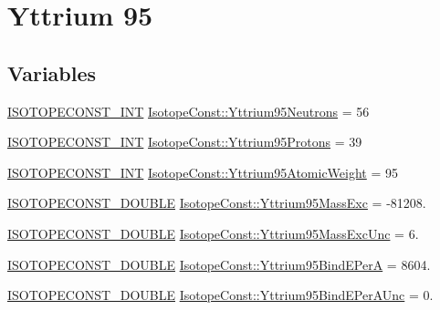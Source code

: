 \hypertarget{group___isotope_const-_yttrium-_y95}{}\section{Yttrium 95}
\label{group___isotope_const-_yttrium-_y95}
\subsection*{Variables}
\begin{DoxyCompactItemize}
\item 
\mbox{\hyperlink{group___isotope_const-_macros_ga5f18360b3e99483a35c32d789e62621c}{I\+S\+O\+T\+O\+P\+E\+C\+O\+N\+S\+T\+\_\+\+I\+NT}} \mbox{\hyperlink{group___isotope_const-_yttrium-_y95_ga8f85eb734a482be6c3b610a2967d51fb}{Isotope\+Const\+::\+Yttrium95\+Neutrons}} = 56
\item 
\mbox{\hyperlink{group___isotope_const-_macros_ga5f18360b3e99483a35c32d789e62621c}{I\+S\+O\+T\+O\+P\+E\+C\+O\+N\+S\+T\+\_\+\+I\+NT}} \mbox{\hyperlink{group___isotope_const-_yttrium-_y95_ga5155b7b4f49dbd48dd85a0bec4a0f83b}{Isotope\+Const\+::\+Yttrium95\+Protons}} = 39
\item 
\mbox{\hyperlink{group___isotope_const-_macros_ga5f18360b3e99483a35c32d789e62621c}{I\+S\+O\+T\+O\+P\+E\+C\+O\+N\+S\+T\+\_\+\+I\+NT}} \mbox{\hyperlink{group___isotope_const-_yttrium-_y95_ga82f6f86631e84db16be46bb376a884b4}{Isotope\+Const\+::\+Yttrium95\+Atomic\+Weight}} = 95
\item 
\mbox{\hyperlink{group___isotope_const-_macros_ga8f45a7272ce02c0b4c65c44636ed719a}{I\+S\+O\+T\+O\+P\+E\+C\+O\+N\+S\+T\+\_\+\+D\+O\+U\+B\+LE}} \mbox{\hyperlink{group___isotope_const-_yttrium-_y95_gaec2ba5a8d73164d57d788c4df63e86fa}{Isotope\+Const\+::\+Yttrium95\+Mass\+Exc}} = -\/81208.
\item 
\mbox{\hyperlink{group___isotope_const-_macros_ga8f45a7272ce02c0b4c65c44636ed719a}{I\+S\+O\+T\+O\+P\+E\+C\+O\+N\+S\+T\+\_\+\+D\+O\+U\+B\+LE}} \mbox{\hyperlink{group___isotope_const-_yttrium-_y95_ga426caf8c1ccc6c5d84141fd91df0d3e4}{Isotope\+Const\+::\+Yttrium95\+Mass\+Exc\+Unc}} = 6.
\item 
\mbox{\hyperlink{group___isotope_const-_macros_ga8f45a7272ce02c0b4c65c44636ed719a}{I\+S\+O\+T\+O\+P\+E\+C\+O\+N\+S\+T\+\_\+\+D\+O\+U\+B\+LE}} \mbox{\hyperlink{group___isotope_const-_yttrium-_y95_ga12a2c9711dc917d7257c215589fdbed7}{Isotope\+Const\+::\+Yttrium95\+Bind\+E\+PerA}} = 8604.
\item 
\mbox{\hyperlink{group___isotope_const-_macros_ga8f45a7272ce02c0b4c65c44636ed719a}{I\+S\+O\+T\+O\+P\+E\+C\+O\+N\+S\+T\+\_\+\+D\+O\+U\+B\+LE}} \mbox{\hyperlink{group___isotope_const-_yttrium-_y95_ga9fa92810df6ecc128cbd91d1047fa9ae}{Isotope\+Const\+::\+Yttrium95\+Bind\+E\+Per\+A\+Unc}} = 0.

\end{DoxyCompactItemize}
